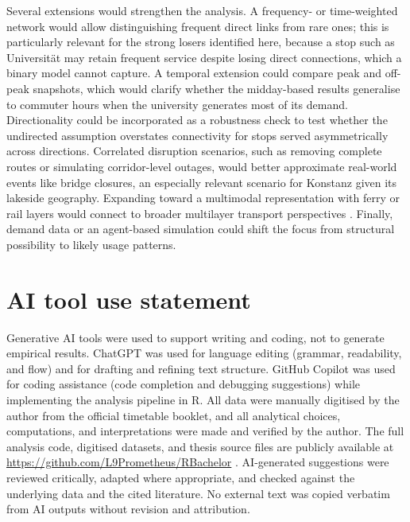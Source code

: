 \documentclass[12pt,a4paper,oneside]{report}
\begin{document}
Several extensions would strengthen the analysis.
A frequency- or time-weighted network would allow distinguishing frequent direct links from rare ones; this is particularly relevant for the strong losers identified here, because a stop such as Universit\"at may retain frequent service despite losing direct connections, which a binary model cannot capture.
A temporal extension could compare peak and off-peak snapshots, which would clarify whether the midday-based results generalise to commuter hours when the university generates most of its demand.
Directionality could be incorporated as a robustness check to test whether the undirected assumption overstates connectivity for stops served asymmetrically across directions.
Correlated disruption scenarios, such as removing complete routes or simulating corridor-level outages, would better approximate real-world events like bridge closures, an especially relevant scenario for Konstanz given its lakeside geography.
Expanding toward a multimodal representation with ferry or rail layers would connect to broader multilayer transport perspectives \citep{alessandretti2022,artime2022}.
Finally, demand data or an agent-based simulation could shift the focus from structural possibility to likely usage patterns.

\clearpage
\chapter*{AI tool use statement}

Generative AI tools were used to support writing and coding, not to generate empirical results.
ChatGPT \citep{openai2025} was used for language editing (grammar, readability, and flow) and for drafting and refining text structure.
GitHub Copilot \citep{github2025} was used for coding assistance (code completion and debugging suggestions) while implementing the analysis pipeline in R.
All data were manually digitised by the author from the official timetable booklet, and all analytical choices, computations, and interpretations were made and verified by the author.
The full analysis code, digitised datasets, and thesis source files are publicly available at \url{https://github.com/L9Prometheus/RBachelor} \citep{bachinger2026}.
AI-generated suggestions were reviewed critically, adapted where appropriate, and checked against the underlying data and the cited literature.
No external text was copied verbatim from AI outputs without revision and attribution.
\end{document}
